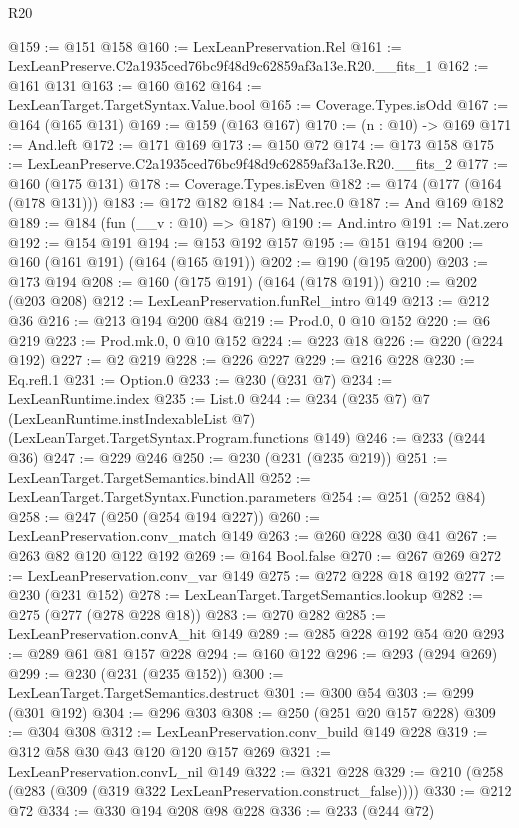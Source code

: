 \begin{lexlean}{R20}
\begin{coremodule}
@159 := @151 @158
@160 := LexLeanPreservation.Rel
@161 := LexLeanPreserve.C2a1935ced76bc9f48d9c62859af3a13e.R20.__fits_1
@162 := @161 @131
@163 := @160 @162
@164 := LexLeanTarget.TargetSyntax.Value.bool
@165 := Coverage.Types.isOdd
@167 := @164 (@165 @131)
@169 := @159 (@163 @167)
@170 := (n : @10) -> @169
@171 := And.left
@172 := @171 @169
@173 := @150 @72
@174 := @173 @158
@175 := LexLeanPreserve.C2a1935ced76bc9f48d9c62859af3a13e.R20.__fits_2
@177 := @160 (@175 @131)
@178 := Coverage.Types.isEven
@182 := @174 (@177 (@164 (@178 @131)))
@183 := @172 @182
@184 := Nat.rec.{0}
@187 := And @169 @182
@189 := @184 (fun (__v : @10) => @187)
@190 := And.intro
@191 := Nat.zero
@192 := @154 @191
@194 := @153 @192 @157
@195 := @151 @194
@200 := @160 (@161 @191) (@164 (@165 @191))
@202 := @190 (@195 @200)
@203 := @173 @194
@208 := @160 (@175 @191) (@164 (@178 @191))
@210 := @202 (@203 @208)
@212 := LexLeanPreservation.funRel_intro @149
@213 := @212 @36
@216 := @213 @194 @200 @84
@219 := Prod.{0, 0} @10 @152
@220 := @6 @219
@223 := Prod.mk.{0, 0} @10 @152
@224 := @223 @18
@226 := @220 (@224 @192)
@227 := @2 @219
@228 := @226 @227
@229 := @216 @228
@230 := Eq.refl.{1}
@231 := Option.{0}
@233 := @230 (@231 @7)
@234 := LexLeanRuntime.index
@235 := List.{0}
@244 := @234
    (@235 @7)
    @7
    (LexLeanRuntime.instIndexableList @7)
    (LexLeanTarget.TargetSyntax.Program.functions @149)
@246 := @233 (@244 @36)
@247 := @229 @246
@250 := @230 (@231 (@235 @219))
@251 := LexLeanTarget.TargetSemantics.bindAll
@252 := LexLeanTarget.TargetSyntax.Function.parameters
@254 := @251 (@252 @84)
@258 := @247 (@250 (@254 @194 @227))
@260 := LexLeanPreservation.conv_match @149
@263 := @260 @228 @30 @41
@267 := @263 @82 @120 @122 @192
@269 := @164 Bool.false
@270 := @267 @269
@272 := LexLeanPreservation.conv_var @149
@275 := @272 @228 @18 @192
@277 := @230 (@231 @152)
@278 := LexLeanTarget.TargetSemantics.lookup
@282 := @275 (@277 (@278 @228 @18))
@283 := @270 @282
@285 := LexLeanPreservation.convA_hit @149
@289 := @285 @228 @192 @54 @20
@293 := @289 @61 @81 @157 @228
@294 := @160 @122
@296 := @293 (@294 @269)
@299 := @230 (@231 (@235 @152))
@300 := LexLeanTarget.TargetSemantics.destruct
@301 := @300 @54
@303 := @299 (@301 @192)
@304 := @296 @303
@308 := @250 (@251 @20 @157 @228)
@309 := @304 @308
@312 := LexLeanPreservation.conv_build @149 @228
@319 := @312 @58 @30 @43 @120 @120 @157 @269
@321 := LexLeanPreservation.convL_nil @149
@322 := @321 @228
@329 := @210 (@258 (@283 (@309 (@319 @322 LexLeanPreservation.construct_false))))
@330 := @212 @72
@334 := @330 @194 @208 @98 @228
@336 := @233 (@244 @72)

\end{coremodule}
\end{lexlean}
